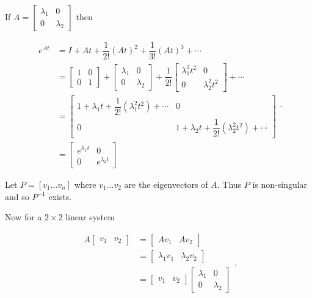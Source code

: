 \documentclass[12pt]{article}
\theoremstyle{definition}
\begin{document}
If $A = \begin{bmatrix} \lambda_1 & 0 \\ 0 & \lambda_2 \end{bmatrix}$ then 

\begin{equation*}
\begin{split}
e^{At} &= I + At + \dfrac{1}{2!} (At)^2 + \dfrac{1}{3!} (At)^3 + \cdots \\
&=
\begin{bmatrix}
1 & 0 \\
0 & 1
\end{bmatrix}
+
\begin{bmatrix}
\lambda_1 & 0 \\
0 & \lambda_2 
\end{bmatrix}
+ 
\dfrac{1}{2!}
\begin{bmatrix}
\lambda_1^2 t^2 & 0 \\
0 & \lambda_2^2 t^2
\end{bmatrix}
+ \cdots \\
&= 
\begin{bmatrix}
1 + \lambda_1 t + \dfrac{1}{2!} (\lambda_1^2 t^2) + \cdots & 0 \\
0 & 1 + \lambda_2 t + \dfrac{1}{2!}(\lambda_2^2 t^2) + \cdots
\end{bmatrix} \\
&= 
\begin{bmatrix}
e^{\lambda_1 t} & 0 \\
0 & e^{\lambda_2 t}
\end{bmatrix}
\end{split}
.
\end{equation*}

Let $P = [v_1 \ldots v_n]$ where $v_1 \ldots v_2$ are the eigenvectors of $A$. Thus $P$ is non-singular and so $P^{-1}$ exists.

Now for a $2 \times 2$ linear system

\begin{equation*}
\begin{split}
A
\begin{bmatrix}
v_1 & v_2
\end{bmatrix}
&=
\begin{bmatrix}
Av_1 & Av_2
\end{bmatrix}
\\
&=
\begin{bmatrix}
\lambda_1 v_1 & \lambda_2 v_2
\end{bmatrix} \\
&=
\begin{bmatrix}
v_1 & v_2
\end{bmatrix}
\begin{bmatrix}
\lambda_1 & 0 \\
0 & \lambda_2
\end{bmatrix}
\end{split}
.
\end{equation*}
\end{document}
